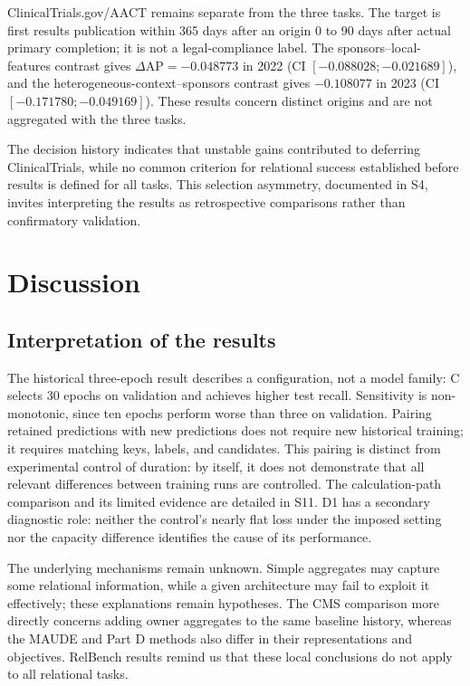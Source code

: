 ClinicalTrials.gov/AACT remains separate from the three tasks. The target is first results publication within 365 days after an origin 0 to 90 days after actual primary completion; it is not a legal-compliance label. The sponsors--local-features contrast gives $\Delta\mathrm{AP}=-0.048773$ in 2022 (CI $[-0.088028;-0.021689]$), and the heterogeneous-context--sponsors contrast gives $-0.108077$ in 2023 (CI $[-0.171780;-0.049169]$)\cite{hgb2026,hgbhistory}. These results concern distinct origins and are not aggregated with the three tasks.

The decision history indicates that unstable gains contributed to deferring ClinicalTrials, while no common criterion for relational success established before results is defined for all tasks. This selection asymmetry, documented in S4, invites interpreting the results as retrospective comparisons rather than confirmatory validation.

\section{Discussion}

\subsection{Interpretation of the results}

The historical three-epoch result describes a configuration, not a model family: C selects 30 epochs on validation and achieves higher test recall. Sensitivity is non-monotonic, since ten epochs perform worse than three on validation. Pairing retained predictions with new predictions does not require new historical training; it requires matching keys, labels, and candidates. This pairing is distinct from experimental control of duration: by itself, it does not demonstrate that all relevant differences between training runs are controlled. The calculation-path comparison and its limited evidence are detailed in S11. D1 has a secondary diagnostic role: neither the control's nearly flat loss under the imposed setting nor the capacity difference identifies the cause of its performance.

The underlying mechanisms remain unknown. Simple aggregates may capture some relational information, while a given architecture may fail to exploit it effectively; these explanations remain hypotheses. The CMS comparison more directly concerns adding owner aggregates to the same baseline history, whereas the MAUDE and Part D methods also differ in their representations and objectives. RelBench results remind us that these local conclusions do not apply to all relational tasks\cite{robinson2024relbench,gu2026relbench}.


